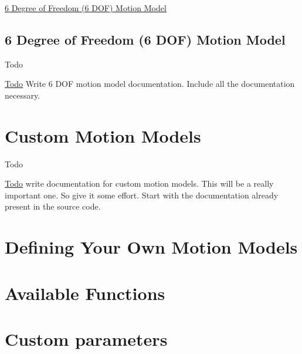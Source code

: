 \hyperlink{sixdof}{6 Degree of Freedom (6 D\-O\-F) Motion Model} \hypertarget{sixdof}{}\subsection{6 Degree of Freedom (6 D\-O\-F) Motion Model}\label{sixdof}
\begin{DoxyRefDesc}{Todo}
\item[\hyperlink{todo__todo000006}{Todo}]Write 6 D\-O\-F motion model documentation. Include all the documentation necessary.\end{DoxyRefDesc}
\hypertarget{custom_motion_models}{}\section{Custom Motion Models}\label{custom_motion_models}
\begin{DoxyRefDesc}{Todo}
\item[\hyperlink{todo__todo000005}{Todo}]write documentation for custom motion models. This will be a really important one. So give it some effort. Start with the documentation already present in the source code.\end{DoxyRefDesc}


\section*{Defining Your Own Motion Models}

\section*{Available Functions}

\section*{Custom parameters}